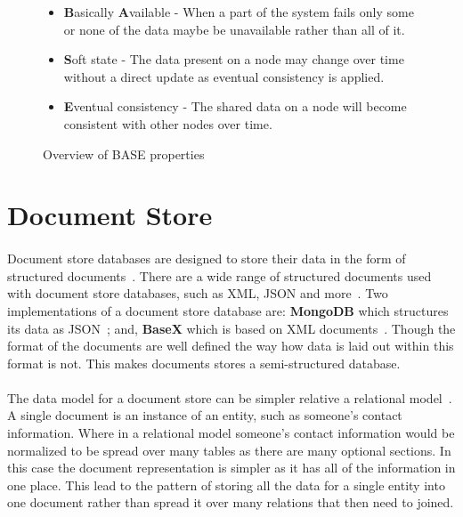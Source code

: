 \documentclass{CRPITStyle}
\renewcommand{\cite}{\citep}
\begin{document}
\begin{figure}
\begin{itemize}
    \item \textbf{B}asically \textbf{A}vailable - When a part of the system
        fails only some or none of the data maybe be unavailable rather than
        all of it.
    \item \textbf{S}oft state - The data present on a node may change over time
        without a direct update as eventual consistency is applied.
    \item \textbf{E}ventual consistency - The shared data on a node will become consistent with
        other nodes over time.
\end{itemize}
\caption{Overview of BASE properties~\cite{base}}\label{l:base}
\end{figure}





\section{Document Store}

\paragraph{}
Document store databases are designed to store their data in the form of
structured documents~\cite{base,nosql_survey}.
There are a wide range of structured documents used with document store
databases, such as XML, JSON and more~\cite{base,compare_nosql}.
Two implementations of a document store database are: \textbf{MongoDB} which
structures its data as JSON~\cite{base}; and, \textbf{BaseX} which is based on XML
documents~\cite{basex}.
Though the format of the documents are well defined the 
way how data is laid out within this format is not.
This makes documents stores a semi-structured database.

\paragraph{}
The data model for a document store can be simpler relative a relational
model~\cite{nosql_survey}.
A single document is an instance of an entity, such as someone's contact information.
Where in a relational model someone's contact information would be
normalized to be spread over many tables as there are many optional
sections.
In this case the document representation is simpler as it has all of the
information in one place.
This lead to the pattern of storing all the data for a single entity into
one document rather than spread it over many relations that then need to
joined.
\end{document}
